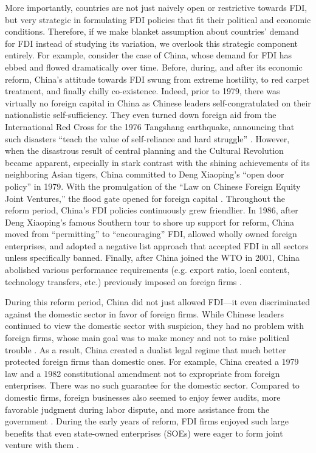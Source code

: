 More importantly, countries are not just naively open or restrictive towards
FDI, but very strategic in formulating FDI policies that fit their political and
economic conditions. Therefore, if we make blanket assumption about countries'
demand for FDI instead of studying its variation, we overlook this strategic
component entirely. For example, consider the case of China, whose demand for
FDI has ebbed and flowed dramatically over time. Before, during, and after its
economic reform, China's attitude towards FDI swung from extreme hostility, to
red carpet treatment, and finally chilly co-existence. Indeed, prior to 1979,
there was virtually no foreign capital in China as Chinese leaders
self-congratulated on their nationalistic self-sufficiency. They even turned
down foreign aid from the International Red Cross for the 1976 Tangshang
earthquake, announcing that such disasters ``teach the value of self-reliance
and hard struggle'' \citep{Butterfield1976}. However, when the disastrous result
of central planning and the Cultural Revolution became apparent, especially in
stark contrast with the shining achievements of its neighboring Asian tigers,
China committed to Deng Xiaoping's ``open door policy'' in 1979. With the
promulgation of the ``Law on Chinese Foreign Equity Joint Ventures,'' the flood
gate opened for foreign capital \citep{Wei1996}. Throughout the reform period,
China's FDI policies continuously grew friendlier. In 1986, after Deng
Xiaoping's famous Southern tour to shore up support for reform, China moved from
``permitting'' to ``encouraging'' FDI, allowed wholly owned foreign enterprises,
and adopted a negative list approach that accepted FDI in all sectors unless
specifically banned. Finally, after China joined the WTO in 2001, China
abolished various performance requirements (e.g. export ratio, local content,
technology transfers, etc.) previously imposed on foreign firms
\citep{Long2005}.

During this reform period, China did not just allowed FDI---it even
discriminated against the domestic sector in favor of foreign firms. While
Chinese leaders continued to view the domestic sector with suspicion, they had
no problem with foreign firms, whose main goal was to make money and not to
raise political trouble \citep{Gallagher2002}. As a result, China created a
dualist legal regime that much better protected foreign firms than domestic
ones. For example, China created a 1979 law and a 1982 constitutional amendment
not to expropriate from foreign enterprises. There was no such guarantee for the
domestic sector. Compared to domestic firms, foreign businesses also seemed to
enjoy fewer audits, more favorable judgment during labor dispute, and more
assistance from the government \citep{Huang2003, Huang2011}. During the early
years of reform, FDI firms enjoyed such large benefits that even state-owned
enterprises (SOEs) were eager to form joint venture with them
\citep[59]{Gu1997}.

